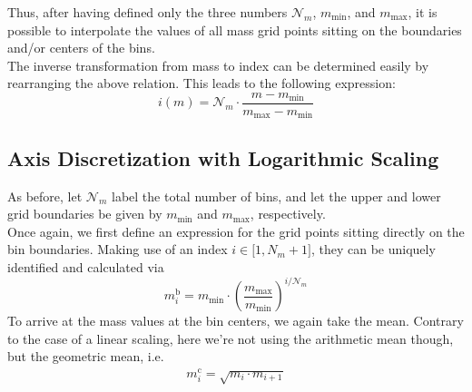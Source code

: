         Thus, after having defined only the three numbers $\mathcal N_m$, $m_\text{min}$, and 
        $m_\text{max}$, it is possible to interpolate the values of all mass grid points sitting on the 
        boundaries and/or centers of the bins.\\
        
        The inverse transformation from mass to index can be determined easily by rearranging the above 
        relation. This leads to the following expression:
        \begin{equation}
            i(m)
                =\mathcal N_m\cdot\frac{m-m_\text{min}}{m_\text{max}-m_\text{min}}
        \end{equation}
        
 
    \subsection{Axis Discretization with Logarithmic Scaling}

        As before, let $\mathcal N_m$ label the total number of bins, and let the upper and lower grid 
        boundaries be given by $m_\text{min}$ and $m_\text{max}$, respectively.\\
        
        Once again, we first define an expression for the grid points sitting directly on the bin 
        boundaries. Making use of an index $i\in\mathcal[1,N_m+1]$, they can be uniquely identified and
        calculated via
        \begin{equation}
            m_i^\text{b}
                =m_\text{min}\cdot\left(\frac{m_\text{max}}{m_\text{min}}\right)^{i/\mathcal N_m}
        \end{equation}
        To arrive at the mass values at the bin centers, we again take the mean. Contrary to the case of 
        a linear scaling, here we're not using the arithmetic mean though, but the geometric mean, i.e.
        \begin{align}
            m_i^\text{c}
                =\sqrt{m_i\cdot m_{i+1}}
        \end{align}
    
